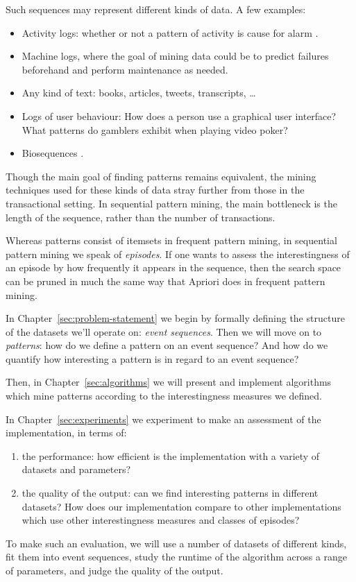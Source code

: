 Such sequences may represent different kinds of data. A few examples:
\begin{itemize}
\item Activity logs: whether or not a pattern of activity is cause for alarm \cite{mannila1997discovery}.
\item Machine logs, where the goal of mining data could be to predict failures beforehand and perform maintenance as needed.
\item Any kind of text: books, articles, tweets, transcripts, \ldots
\item Logs of user behaviour: How does a person use a graphical user interface? What patterns do gamblers exhibit when playing video poker?
\item Biosequences \cite{biosequences}.
\end{itemize}

Though the main goal of finding patterns remains equivalent, the mining techniques used for these kinds of data stray further from those in the transactional setting. In sequential pattern mining, the main bottleneck is the length of the sequence, rather than the number of transactions.

Whereas patterns consist of itemsets in frequent pattern mining, in sequential pattern mining we speak of \emph{episodes}. If one wants to assess the interestingness of an episode by how frequently it appears in the sequence, then the search space can be pruned in much the same way that Apriori does in frequent pattern mining.

In Chapter~\ref{sec:problem-statement} we begin by formally defining the structure of the datasets we'll operate on: \emph{event sequences}. Then we will move on to \emph{patterns}: how do we define a pattern on an event sequence?
And how do we quantify how interesting a pattern is in regard to an event sequence?

Then, in Chapter~\ref{sec:algorithms} we will present and implement algorithms which mine patterns according to the interestingness measures we defined.

In Chapter~\ref{sec:experiments} we experiment to make an assessment of the implementation, in terms of:

\begin{enumerate}
\item the performance: how efficient is the implementation with a variety of datasets and parameters?
\item the quality of the output: can we find interesting patterns in different datasets? How does our implementation compare to other implementations which use other interestingness measures and classes of episodes?
\end{enumerate}

To make such an evaluation, we will use a number of datasets of different kinds, fit them into event sequences, study the runtime of the algorithm across a range of parameters, and judge the quality of the output.
